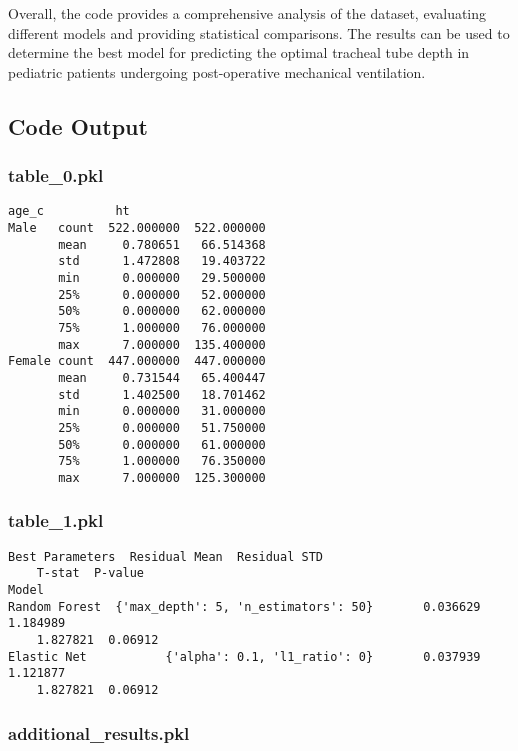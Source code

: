 \documentclass[11pt]{article}
\begin{document}
Overall, the code provides a comprehensive analysis of the dataset, evaluating different models and providing statistical comparisons. The results can be used to determine the best model for predicting the optimal tracheal tube depth in pediatric patients undergoing post-operative mechanical ventilation.

\subsection{Code Output}

\subsubsection*{table\_0.pkl}

\begin{Verbatim}[tabsize=4]
                   age_c          ht
Male   count  522.000000  522.000000
       mean     0.780651   66.514368
       std      1.472808   19.403722
       min      0.000000   29.500000
       25%      0.000000   52.000000
       50%      0.000000   62.000000
       75%      1.000000   76.000000
       max      7.000000  135.400000
Female count  447.000000  447.000000
       mean     0.731544   65.400447
       std      1.402500   18.701462
       min      0.000000   31.000000
       25%      0.000000   51.750000
       50%      0.000000   61.000000
       75%      1.000000   76.350000
       max      7.000000  125.300000
\end{Verbatim}

\subsubsection*{table\_1.pkl}

\begin{Verbatim}[tabsize=4]
                                    Best Parameters  Residual Mean  Residual STD
	T-stat  P-value
Model
Random Forest  {'max_depth': 5, 'n_estimators': 50}       0.036629      1.184989
	1.827821  0.06912
Elastic Net           {'alpha': 0.1, 'l1_ratio': 0}       0.037939      1.121877
	1.827821  0.06912
\end{Verbatim}

\subsubsection*{additional\_results.pkl}
\end{document}
